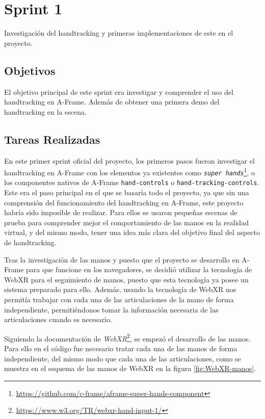 \documentclass[a4paper, 12pt]{book}
\begin{document}
\section{Sprint 1}
\label{sec:sprint1}
Investigación del handtracking y primeras implementaciones de este en el proyecto.

\subsection{Objetivos}
\label{subsec:objetivo-principal1}
El objetivo principal de este sprint era investigar y comprender el uso del handtracking en A-Frame. 
Además de obtener una primera demo del handtracking en la escena.

\subsection{Tareas Realizadas}
\label{subsec:implementacion1}
En este primer sprint oficial del proyecto, los primeros pasos fueron investigar el handtracking en A-Frame con los elementos ya existentes como \textit{\texttt{super hands}}\footnote{\url{https://github.com/c-frame/aframe-super-hands-component}}, o los componentes nativos de A-Frame \texttt{hand-controls} o \texttt{hand-tracking-controls}. Este era el paso principal en el que se basaría todo el proyecto, ya que sin una comprensión del funcionamiento del handtracking en A-Frame, este proyecto habría sido imposible de realizar.
Para ellos se usaron pequeñas escenas de prueba para comprender mejor el comportamiento de las manos en la realidad virtual, y del mismo modo, tener una idea más clara del objetivo final del aspecto de handtracking. 

Tras la investigación de las manos y puesto que el proyecto se desarrollo en A-Frame para que funcione en los navegadores, se decidió utilizar la tecnología de WebXR para el seguimiento de manos, puesto que esta tecnología ya posee un sistema preparado para ello. Además, usando la tecnología de WebXR nos permitía trabajar con cada una de las articulaciones de la mano de forma independiente, permitiéndonos tomar la información necesaria de las articulaciones cuando es necesario. 

Siguiendo la documentación de \textit{WebXR}\footnote{\url{https://www.w3.org/TR/webxr-hand-input-1/}}, se empezó el desarrollo de las manos. Para ello en el código fue necesario tratar cada una de las manos de forma independiente, del mismo modo que cada una de las articulaciones, como se muestra en el esquema de las manos de WebXR en la figura \ref{fig:WebXR-manos}. 
\end{document}
